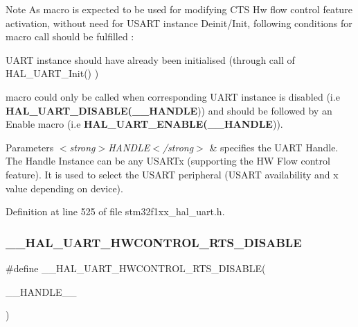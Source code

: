 \begin{DoxyNote}{Note}
As macro is expected to be used for modifying C\+TS Hw flow control feature activation, without need for U\+S\+A\+RT instance Deinit/\+Init, following conditions for macro call should be fulfilled \+:
\begin{DoxyItemize}
\item U\+A\+RT instance should have already been initialised (through call of H\+A\+L\+\_\+\+U\+A\+R\+T\+\_\+\+Init() )
\item macro could only be called when corresponding U\+A\+RT instance is disabled (i.\+e {\bfseries H\+A\+L\+\_\+\+U\+A\+R\+T\+\_\+\+D\+I\+S\+A\+B\+LE(\+\_\+\+\_\+\+H\+A\+N\+D\+LE})) and should be followed by an Enable macro (i.\+e {\bfseries H\+A\+L\+\_\+\+U\+A\+R\+T\+\_\+\+E\+N\+A\+B\+LE(\+\_\+\+\_\+\+H\+A\+N\+D\+LE})). 
\end{DoxyItemize}
\end{DoxyNote}

\begin{DoxyParams}{Parameters}
{\em $<$strong$>$\+H\+A\+N\+D\+L\+E$<$/strong$>$} & specifies the U\+A\+RT Handle. The Handle Instance can be any U\+S\+A\+R\+Tx (supporting the HW Flow control feature). It is used to select the U\+S\+A\+RT peripheral (U\+S\+A\+RT availability and x value depending on device). \\
\hline
\end{DoxyParams}


Definition at line 525 of file stm32f1xx\+\_\+hal\+\_\+uart.\+h.

\mbox{\label{group___u_a_r_t___exported___macros_ga8c034e96ad8f263cafeb5898ff7311fd}} 
\subsubsection{\texorpdfstring{\+\_\+\+\_\+\+H\+A\+L\+\_\+\+U\+A\+R\+T\+\_\+\+H\+W\+C\+O\+N\+T\+R\+O\+L\+\_\+\+R\+T\+S\+\_\+\+D\+I\+S\+A\+B\+LE}{\_\_HAL\_UART\_HWCONTROL\_RTS\_DISABLE}}
{\footnotesize\ttfamily \#define \+\_\+\+\_\+\+H\+A\+L\+\_\+\+U\+A\+R\+T\+\_\+\+H\+W\+C\+O\+N\+T\+R\+O\+L\+\_\+\+R\+T\+S\+\_\+\+D\+I\+S\+A\+B\+LE(\begin{DoxyParamCaption}\item[{}]{\+\_\+\+\_\+\+H\+A\+N\+D\+L\+E\+\_\+\+\_\+ }\end{DoxyParamCaption})}

